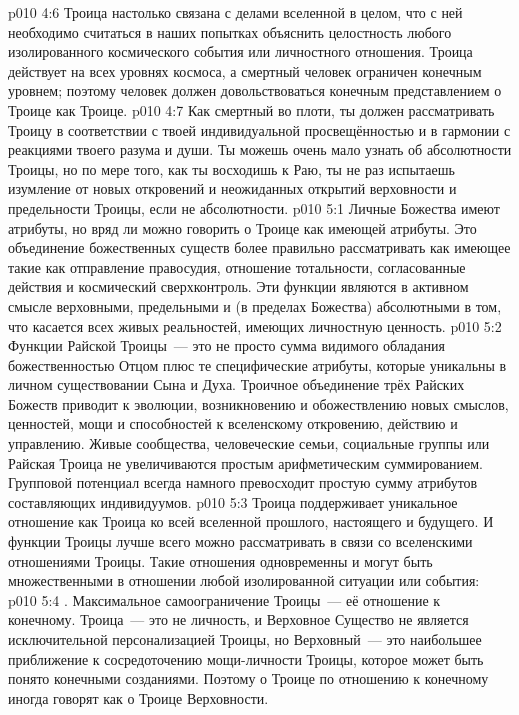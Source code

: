 \vs p010 4:6 \pc Троица настолько связана с делами вселенной в целом, что с ней необходимо считаться в наших попытках объяснить целостность любого изолированного космического события или личностного отношения. Троица действует на всех уровнях космоса, а смертный человек ограничен конечным уровнем; поэтому человек должен довольствоваться конечным представлением о Троице как Троице.
\vs p010 4:7 Как смертный во плоти, ты должен рассматривать Троицу в соответствии с твоей индивидуальной просвещённостью и в гармонии с реакциями твоего разума и души. Ты можешь очень мало узнать об абсолютности Троицы, но по мере того, как ты восходишь к Раю, ты не раз испытаешь изумление от новых откровений и неожиданных открытий верховности и предельности Троицы, если не абсолютности.
\vs p010 5:1 Личные Божества имеют атрибуты, но вряд ли можно говорить о Троице как имеющей атрибуты. Это объединение божественных существ более правильно рассматривать как имеющее  такие как отправление правосудия, отношение тотальности, согласованные действия и космический сверхконтроль. Эти функции являются в активном смысле верховными, предельными и (в пределах Божества) абсолютными в том, что касается всех живых реальностей, имеющих личностную ценность.
\vs p010 5:2 Функции Райской Троицы~--- это не просто сумма видимого обладания божественностью Отцом плюс те специфические атрибуты, которые уникальны в личном существовании Сына и Духа. Троичное объединение трёх Райских Божеств приводит к эволюции, возникновению и обожествлению новых смыслов, ценностей, мощи и способностей к вселенскому откровению, действию и управлению. Живые сообщества, человеческие семьи, социальные группы или Райская Троица не увеличиваются простым арифметическим суммированием. Групповой потенциал всегда намного превосходит простую сумму атрибутов составляющих индивидуумов.
\vs p010 5:3 \pc Троица поддерживает уникальное отношение как Троица ко всей вселенной прошлого, настоящего и будущего. И функции Троицы лучше всего можно рассматривать в связи со вселенскими отношениями Троицы. Такие отношения одновременны и могут быть множественными в отношении любой изолированной ситуации или события:
\vs p010 5:4 . Максимальное самоограничение Троицы~--- её отношение к конечному. Троица~--- это не личность, и Верховное Существо не является исключительной персонализацией Троицы, но Верховный~--- это наибольшее приближение к сосредоточению мощи\hyp{}личности Троицы, которое может быть понято конечными созданиями. Поэтому о Троице по отношению к конечному иногда говорят как о Троице Верховности.
